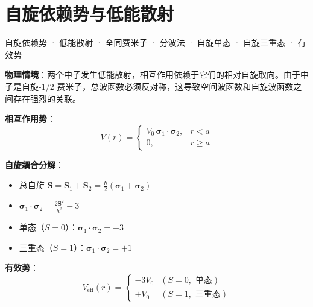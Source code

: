 
\section{自旋依赖势与低能散射}
\label{sec:spin-dependent-potential}

\begin{tipbox}[关键词标签]
自旋依赖势 · 低能散射 · 全同费米子 · 分波法 · 自旋单态 · 自旋三重态 · 有效势
\end{tipbox}

\begin{modelbox}
\textbf{物理情境}：两个中子发生低能散射，相互作用依赖于它们的相对自旋取向。由于中子是自旋-$1/2$ 费米子，总波函数必须反对称，这导致空间波函数和自旋波函数之间存在强烈的关联。

\textbf{相互作用势}：
\[
V(r)=\begin{cases}V_0\,\boldsymbol{\sigma}_1\cdot\boldsymbol{\sigma}_2,&r<a\\0,&r\geq a\end{cases}
\]

\textbf{自旋耦合分解}：
\begin{itemize}[nosep]
    \item 总自旋 $\mathbf{S}=\mathbf{S}_1+\mathbf{S}_2=\frac{\hbar}{2}(\boldsymbol{\sigma}_1+\boldsymbol{\sigma}_2)$
    \item $\boldsymbol{\sigma}_1\cdot\boldsymbol{\sigma}_2=\frac{2\mathbf{S}^2}{\hbar^2}-3$
    \item 单态（$S=0$）：$\boldsymbol{\sigma}_1\cdot\boldsymbol{\sigma}_2=-3$
    \item 三重态（$S=1$）：$\boldsymbol{\sigma}_1\cdot\boldsymbol{\sigma}_2=+1$
\end{itemize}

\textbf{有效势}：
\[
V_{\text{eff}}(r)=\begin{cases}-3V_0&(S=0,\text{ 单态})\\+V_0&(S=1,\text{ 三重态})\end{cases}
\]
\end{modelbox}


